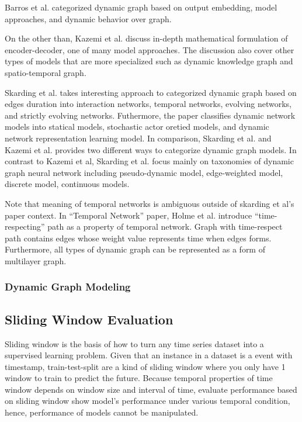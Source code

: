 \documentclass{IEEEtran}
\begin{document}
Barros et al. \cite{barrosSurveyEmbeddingDynamic2021} categorized dynamic graph based on output embedding, model approaches, and dynamic behavior over graph.

On the other than, Kazemi et al. \cite{kazemiRepresentationLearningDynamica} discuss in-depth mathematical formulation of encoder-decoder, one of many model approaches. The discussion also cover other types of models that are more specialized such as dynamic knowledge graph and spatio-temporal graph.

Skarding et al. \cite{skardingFoundationsModelingDynamic2021} takes interesting approach to categorized dynamic graph based on edges duration into interaction networks, temporal networks, evolving networks, and strictly evolving networks. Futhermore, the paper classifies dynamic network models into statical models, stochastic actor oretied models, and dynamic network representation learning model. In comparison, Skarding et al. \cite{skardingFoundationsModelingDynamic2021} and Kazemi et al. \cite{kazemiRepresentationLearningDynamica} provides two different ways to categorize dynamic graph models. In contrast to Kazemi et al, Skarding et al. focus mainly on taxonomies of dynamic graph neural network including pseudo-dynamic model, edge-weighted model, discrete model, continuous models.

Note that meaning of temporal networks is ambiguous outside of skarding et al's paper \cite{skardingFoundationsModelingDynamic2021} context. In ``Temporal Network'' paper, Holme et al. \cite{holme2012temporal} introduce ``time-respecting'' path as a property of temporal network. Graph with time-respect path contains edges whose weight value represents time when edges forms. Furthermore, all types of dynamic graph can be represented as a form of multilayer graph. \cite{kivela2014multilayer}

\subsubsection{Dynamic Graph Modeling}
\label{sec:org42b79fd}

\subsection{Sliding Window Evaluation}
\label{sec:orgbf4234c}
Sliding window is the basis of how to turn any time series dataset into a supervised learning problem. Given that an instance in a dataset is a event with timestamp, train-test-split are a kind of sliding window where you only have 1 window to train to predict the future. Because temporal properties of time window depends on window size and interval of time, evaluate performance based on sliding window show model's performance under various temporal condition, hence, performance of models cannot be manipulated.
\end{document}

